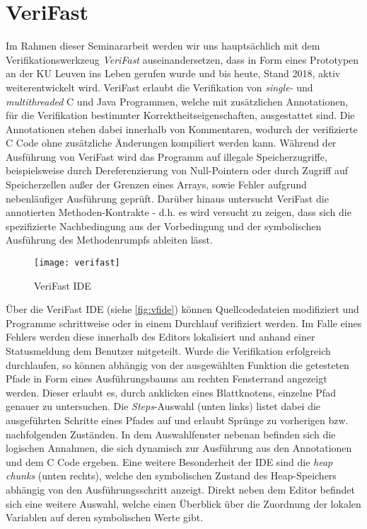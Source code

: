\section{VeriFast}

Im Rahmen dieser Seminararbeit werden wir uns hauptsächlich mit dem Verifikationswerkzeug \emph{VeriFast} auseinandersetzen, dass in Form eines Prototypen an der KU Leuven ins Leben gerufen wurde und bis heute, Stand 2018, aktiv weiterentwickelt wird. VeriFast erlaubt die Verifikation von \emph{single-} und \emph{multithreaded} C und Java Programmen, welche mit zusätzlichen Annotationen, für die Verifikation bestimmter Korrektheitseigenschaften, ausgestattet sind. Die Annotationen stehen dabei innerhalb von Kommentaren, wodurch der verifizierte C Code ohne zusätzliche Änderungen kompiliert werden kann. Während der Ausführung von VeriFast wird das Programm auf illegale Speicherzugriffe, beispielsweise durch Dereferenzierung von Null-Pointern oder durch Zugriff auf Speicherzellen außer der Grenzen eines Arrays, sowie Fehler aufgrund nebenläufiger Ausführung geprüft. Darüber hinaus untersucht VeriFast die annotierten Methoden-Kontrakte - d.h. es wird versucht zu zeigen, dass sich die spezifizierte Nachbedingung aus der Vorbedingung und der symbolischen Ausführung des Methodenrumpfs ableiten lässt. \cite{Jacobs2010}

\begin{figure}[!hbt]
	\centering
	\texttt{[image: verifast]}
	\caption{VeriFast IDE}
	\label{fig:vfide}
\end{figure}

\noindent
Über die VeriFast IDE (siehe \vref{fig:vfide}) können Quellcodedateien modifiziert und Programme schrittweise oder in einem Durchlauf verifiziert werden. Im Falle eines Fehlers werden diese innerhalb des Editors lokalisiert und anhand einer Statusmeldung dem Benutzer mitgeteilt. Wurde die Verifikation erfolgreich durchlaufen, so können abhängig von der ausgewählten Funktion die getesteten Pfade in Form eines Ausführungsbaums am rechten Fensterrand angezeigt werden. Dieser erlaubt es, durch anklicken eines Blattknotens, einzelne Pfad genauer zu untersuchen. Die \emph{Steps}-Auswahl (unten links) listet dabei die ausgeführten Schritte eines Pfades auf und erlaubt Sprünge zu vorherigen bzw. nachfolgenden Zuständen. In dem Auswahlfenster nebenan befinden sich die logischen Annahmen, die sich dynamisch zur Ausführung aus den Annotationen und dem C Code ergeben. Eine weitere Besonderheit der IDE sind die \emph{heap chunks} (unten rechts), welche den symbolischen Zustand des Heap-Speichers abhängig von den Ausführungsschritt anzeigt. Direkt neben dem Editor befindet sich eine weitere Auswahl, welche einen Überblick über die Zuordnung der lokalen Variablen auf deren symbolischen Werte gibt. \cite{Jacobs2017}

